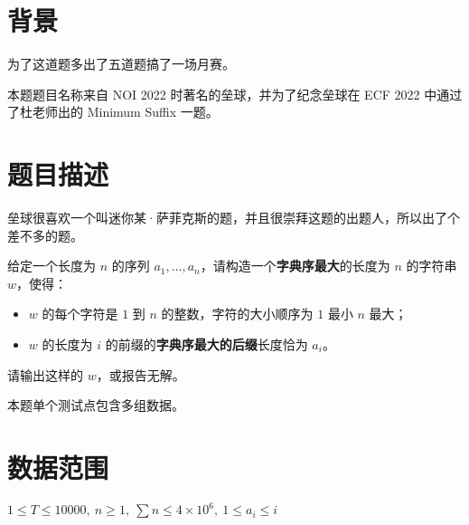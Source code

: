 \documentclass[a4paper,10pt]{article}
\begin{document}
\newpage

\section*{背景}

为了这道题多出了五道题搞了一场月赛。

本题题目名称来自 NOI 2022 时著名的垒球，并为了纪念垒球在 ECF 2022 中通过了杜老师出的 Minimum Suffix 一题。

\section*{题目描述}

垒球很喜欢一个叫迷你某·萨菲克斯的题，并且很崇拜这题的出题人，所以出了个差不多的题。

给定一个长度为 $n$ 的序列 $a_1,\ldots,a_n$，请构造一个\textbf{字典序最大}的长度为 $n$ 的字符串 $w$，使得：

\begin{itemize}
\item $w$ 的每个字符是 $1$ 到 $n$ 的整数，字符的大小顺序为 $1$ 最小 $n$ 最大；

\item $w$ 的长度为 $i$ 的前缀的\textbf{字典序最大的后缀}长度恰为 $a_i$。
\end{itemize}

请输出这样的 $w$，或报告无解。

本题单个测试点包含多组数据。

\section*{数据范围}

$1\leq T\leq 10000,\ n\ge 1,\ \sum n\leq 4\times 10^6,\ 1\leq a_i\leq i$

\newpage
\end{document}
